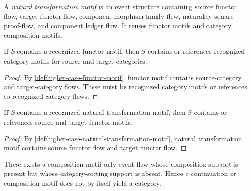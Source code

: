 \begin{definition}
\label{def:higher-case-natural-transformation-motif}
A \emph{natural transformation motif} is an event structure containing source functor flow, target functor flow, component morphism family flow, naturality-square proof-flow, and component ledger flow. It reuses functor motifs and category composition motifs.
\end{definition}

\begin{proposition}
\label{prop:higher-case-functor-extends-category}
If $S$ contains a recognized functor motif, then $S$ contains or references recognized category motifs for source and target categories.
\end{proposition}

\begin{proof}
By \autoref{def:higher-case-functor-motif}, functor motif contains source-category and target-category flows. These must be recognized category motifs or references to recognized category flows.
\end{proof}

\begin{proposition}
\label{prop:higher-case-natural-transformation-extends-functor}
If $S$ contains a recognized natural transformation motif, then $S$ contains or references source and target functor motifs.
\end{proposition}

\begin{proof}
By \autoref{def:higher-case-natural-transformation-motif}, natural transformation motif contains source functor flow and target functor flow.
\end{proof}

\begin{theorem}
\label{thm:higher-case-composition-not-category}
There exists a composition-motif-only event flow whose composition support is present but whose category-sorting support is absent. Hence a continuation or composition motif does not by itself yield a category.
\end{theorem}

